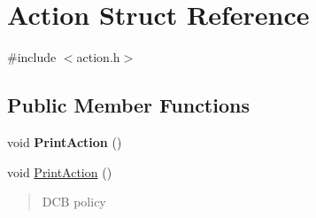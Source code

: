 \hypertarget{structAction}{}\section{Action Struct Reference}
\label{structAction}


{\ttfamily \#include $<$action.\+h$>$}

\subsection*{Public Member Functions}
\begin{DoxyCompactItemize}
\item 
\mbox{\label{structAction_a64ec8f147b8c40f9de1094f8a6f94eb5}} 
void {\bfseries Print\+Action} ()
\item 
void \hyperlink{structAction_a64ec8f147b8c40f9de1094f8a6f94eb5}{Print\+Action} ()
\begin{DoxyCompactList}\small\item\em \begin{quote}
D\+CB policy \end{quote}
\end{DoxyCompactList}\end{DoxyCompactItemize}
